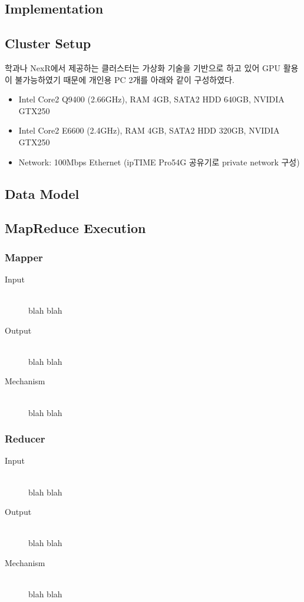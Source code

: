 \documentclass[a4paper]{article}
\begin{document}
\begin{multicols}{2}
\section{Implementation}
\subsection{Cluster Setup}
학과나 NexR에서 제공하는 클러스터는 가상화 기술을 기반으로 하고 있어 GPU 활용이 불가능하였기 때문에 개인용 PC 2개를 아래와 같이 구성하였다.
\begin{itemize}
	\item Intel Core2 Q9400 (2.66GHz), RAM 4GB, SATA2 HDD 640GB, NVIDIA GTX250
	\item Intel Core2 E6600 (2.4GHz), RAM 4GB, SATA2 HDD 320GB, NVIDIA GTX250
	\item Network: 100Mbps Ethernet (ipTIME Pro54G 공유기로 private network 구성)
\end{itemize}
\subsection{Data Model}
\subsection{MapReduce Execution}
\subsubsection{Mapper}
\begin{description}
	\item[Input] \hfill \\
	blah blah
	\item[Output] \hfill \\
	blah blah
	\item[Mechanism] \hfill \\
	blah blah
\end{description}
\subsubsection{Reducer}
\begin{description}
	\item[Input] \hfill \\
	blah blah
	\item[Output] \hfill \\
	blah blah
	\item[Mechanism] \hfill \\
	blah blah
\end{description}


\end{multicols}
\end{document}
